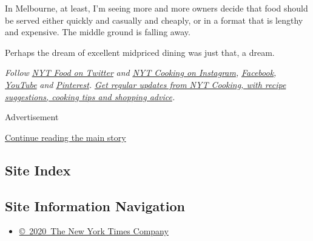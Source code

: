 In Melbourne, at least, I'm seeing more and more owners decide that food
should be served either quickly and casually and cheaply, or in a format
that is lengthy and expensive. The middle ground is falling away.

Perhaps the dream of excellent midpriced dining was just that, a dream.

\emph{Follow} \href{https://twitter.com/nytfood}{\emph{NYT Food on
Twitter}} \emph{and}
\href{https://www.instagram.com/nytcooking/}{\emph{NYT Cooking on
Instagram}}\emph{,}
\href{https://www.facebook.com/nytcooking/}{\emph{Facebook}}\emph{,}
\href{https://www.youtube.com/nytcooking}{\emph{YouTube}} \emph{and}
\href{https://www.pinterest.com/nytcooking/}{\emph{Pinterest}}\emph{.}
\href{https://www.nytimes.com/newsletters/cooking}{\emph{Get regular
updates from NYT Cooking, with recipe suggestions, cooking tips and
shopping advice}}\emph{.}

Advertisement

\protect\hyperlink{after-bottom}{Continue reading the main story}

\hypertarget{site-index}{%
\subsection{Site Index}\label{site-index}}

\hypertarget{site-information-navigation}{%
\subsection{Site Information
Navigation}\label{site-information-navigation}}

\begin{itemize}
\tightlist
\item
  \href{https://help.nytimes.com/hc/en-us/articles/115014792127-Copyright-notice}{©~2020~The
  New York Times Company}
\end{itemize}

